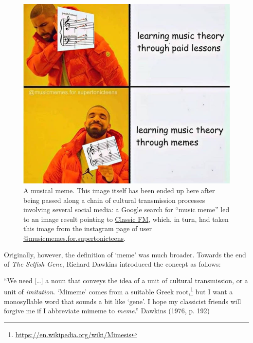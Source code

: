 \documentclass[
  a4paperpaper,
  ,captions=tableheading
]{scrbook}
\renewenvironment{quote}{\begin{customblockquote}\list{}{\rightmargin=0em\leftmargin=0em}%
\item\relax\color{blockquote-text}\ignorespaces}{\unskip\unskip\endlist\end{customblockquote}}
\begin{document}
\begin{figure}

{\centering \includegraphics{img/music_meme.jpeg}

}

\caption{A musical meme. This image itself has been ended up here after
being passed along a chain of cultural transmission processes involving
several social media: a Google search for ``music meme'' led to an image
result pointing to
\href{https://www.classicfm.com/discover-music/humour/classical-music-memes-distract-from-practice/}{Classic
FM}, which, in turn, had taken this image from the instagram page of
user
\href{https://www.instagram.com/musicmemes.for.supertonicteens}{@musicmemes.for.supertonicteens}.}

\end{figure}

Originally, however, the definition of `meme' was much broader. Towards
the end of \emph{The Selfish Gene}, Richard Dawkins introduced the
concept as follows:

\begin{quote}
``We need {[}\ldots{]} a noun that conveys the idea of a unit of
cultural transmission, or a unit of \emph{imitation}. `Mimeme' comes
from a suitable Greek root,\footnote{\url{https://en.wikipedia.org/wiki/Mimesis}}
but I want a monosyllable word that sounds a bit like `gene'. I hope my
classicist friends will forgive me if I abbreviate mimeme to
\emph{meme}.'' Dawkins (1976, p. 192)
\end{quote}
\end{document}
